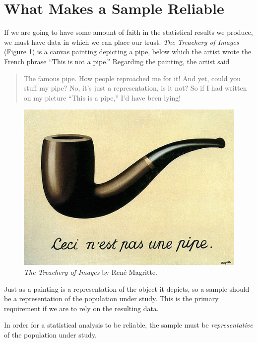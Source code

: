 \documentclass[
]{book}
\theoremstyle{plain}
\theoremstyle{mydefn}
\theoremstyle{myexmpl}
\theoremstyle{remark}
\begin{document}
\hypertarget{what-makes-a-sample-reliable}{%
\section{What Makes a Sample Reliable}\label{what-makes-a-sample-reliable}}

If we are going to have some amount of faith in the statistical results we produce, we must have data in which we can place our trust. \emph{The Treachery of Images} (Figure \ref{fig:data-pipe-img}) is a canvas painting depicting a pipe, below which the artist wrote the French phrase ``This is not a pipe.'' Regarding the painting, the artist said

\begin{quote}
The famous pipe. How people reproached me for it! And yet, could you stuff my pipe? No, it's just a representation, is it not? So if I had written on my picture ``This is a pipe,'' I'd have been lying!
\end{quote}



\begin{figure}

{\centering \includegraphics[width=0.8\linewidth]{./images/Data-Pipe} 

}

\caption{\emph{The Treachery of Images} by René Magritte.}\label{fig:data-pipe-img}
\end{figure}

Just as a painting is a representation of the object it depicts, so a sample should be a representation of the population under study. This is the primary requirement if we are to rely on the resulting data.

\begin{rmdkeyidea}
In order for a statistical analysis to be reliable, the sample must be \emph{representative} of the population under study.
\end{rmdkeyidea}
\end{document}
